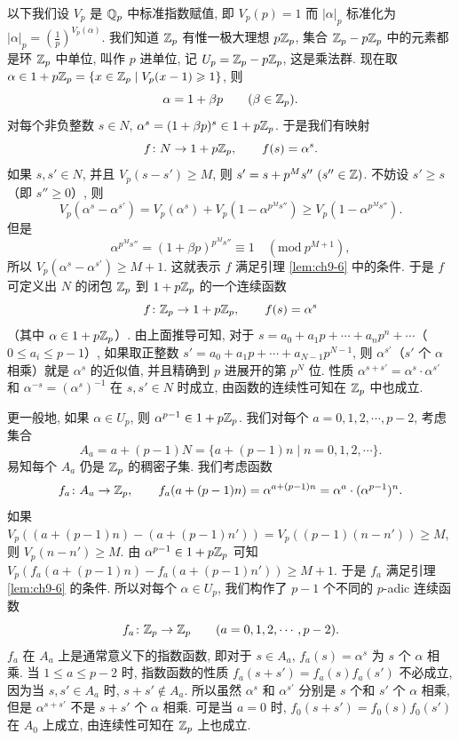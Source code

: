 以下我们设 $V_p$ 是 $\mathbb{Q}_p$ 中标准指数赋值, 即 $V_p(p)=1$ 而 $|\alpha|_p$ 标准化为 $|\alpha|_p=\left(\frac{1}{p}\right)^{V_p(\alpha)}$. 我们知道 $\mathbb{Z}_p$ 有惟一极大理想 $p\mathbb{Z}_p$, 集合 $\mathbb{Z}_p-p\mathbb{Z}_p$ 中的元素都是环 $\mathbb{Z}_p$ 中单位, 叫作 $p$ 进单位, 记 $U_p=\mathbb{Z}_p-p\mathbb{Z}_p$, 这是乘法群. 现在取 $\alpha\in 1+p\mathbb{Z}_p=\{x\in\mathbb{Z}_p\mid V_p(x-1)\geqslant 1\}$, 则
\[
  \alpha=1+\beta p\qquad(\beta\in\mathbb{Z}_p).
\]
对每个非负整数 $s\in N$, $\alpha^s=(1+\beta p)^s\in 1+p\mathbb{Z}_p$. 于是我们有映射
\[
  f\colon N\to 1+p\mathbb{Z}_p,\qquad f(s)=\alpha^s.
\]
如果 $s,s'\in N$, 并且 $V_p(s-s')\geqslant M$, 则 $s'=s+p^Ms''\ (s''\in\mathbb{Z})$. 不妨设 $s'\geqslant s$（即 $s''\geqslant 0$）, 则
\[
  V_p(\alpha^s-\alpha^{s'})=V_p(\alpha^s)+V_p\left(1-\alpha^{p^Ms''}\right)
  \geqslant V_p\left(1-\alpha^{p^Ms''}\right).
\]
但是
\[
  \alpha^{p^Ms''}=(1+\beta p)^{p^Ms''}\equiv 1\quad(\mathrm{mod}\ p^{M+1}),
\]
所以 $V_p(\alpha^s-\alpha^{s'})\geqslant M+1$. 这就表示 $f$ 满足引理 \ref{lem:ch9-6} 中的条件. 于是 $f$ 可定义出 $N$ 的闭包 $\mathbb{Z}_p$ 到 $1+p\mathbb{Z}_p$ 的一个连续函数
\[
  f\colon\mathbb{Z}_p\to 1+p\mathbb{Z}_p,\qquad f(s)=\alpha^s
\]
（其中 $\alpha\in 1+p\mathbb{Z}_p$）. 由上面推导可知, 对于 $s=a_0+a_1p+\cdots+a_np^n+\cdots$（$0\leqslant a_i\leqslant p-1$）, 如果取正整数 $s'=a_0+a_1p+\cdots+a_{N-1}p^{N-1}$, 则 $\alpha^{s'}$（$s'$ 个 $\alpha$ 相乘）就是 $\alpha^s$ 的近似值, 并且精确到 $p$ 进展开的第 $p^N$ 位. 性质 $\alpha^{s+s'}=\alpha^s\cdot\alpha^{s'}$ 和 $\alpha^{-s}=(\alpha^s)^{-1}$ 在 $s,s'\in N$ 时成立, 由函数的连续性可知在 $\mathbb{Z}_p$ 中也成立.

更一般地, 如果 $\alpha\in U_p$, 则 $\alpha^{p-1}\in 1+p\mathbb{Z}_p$. 我们对每个 $a=0,1,2,\cdots,p-2$, 考虑集合
\[
  A_a=a+(p-1)N=\{a+(p-1)n\mid n=0,1,2,\cdots\}.
\]
易知每个 $A_a$ 仍是 $\mathbb{Z}_p$ 的稠密子集. 我们考虑函数
\[
  f_a\colon A_a\to\mathbb{Z}_p,\qquad
  f_a(a+(p-1)n)=\alpha^{a+(p-1)n}=\alpha^a\cdot(\alpha^{p-1})^n.
\]
如果 $V_p((a+(p-1)n)-(a+(p-1)n'))=V_p((p-1)(n-n'))\geqslant M$, 则 $V_p(n-n')\geqslant M$. 由 $\alpha^{p-1}\in 1+p\mathbb{Z}_p$ 可知 $V_p(f_a(a+(p-1)n)-f_a(a+(p-1)n'))\geqslant M+1$. 于是 $f_a$ 满足引理 \ref{lem:ch9-6} 的条件. 所以对每个 $\alpha\in U_p$, 我们构作了 $p-1$ 个不同的 $p$-adic 连续函数
\[
  f_a\colon\mathbb{Z}_p\to\mathbb{Z}_p\qquad(a=0,1,2,\cdots,p-2).
\]
$f_a$ 在 $A_a$ 上是通常意义下的指数函数, 即对于 $s\in A_a$, $f_a(s)=\alpha^s$ 为 $s$ 个 $\alpha$ 相乘. 当 $1\leqslant a\leqslant p-2$ 时, 指数函数的性质 $f_a(s+s')=f_a(s)f_a(s')$ 不必成立, 因为当 $s,s'\in A_a$ 时, $s+s'\notin A_a$. 所以虽然 $\alpha^s$ 和 $\alpha^{s'}$ 分别是 $s$ 个和 $s'$ 个 $\alpha$ 相乘, 但是 $\alpha^{s+s'}$ 不是 $s+s'$ 个 $\alpha$ 相乘. 可是当 $a=0$ 时, $f_0(s+s')=f_0(s)f_0(s')$ 在 $A_0$ 上成立, 由连续性可知在 $\mathbb{Z}_p$ 上也成立.

